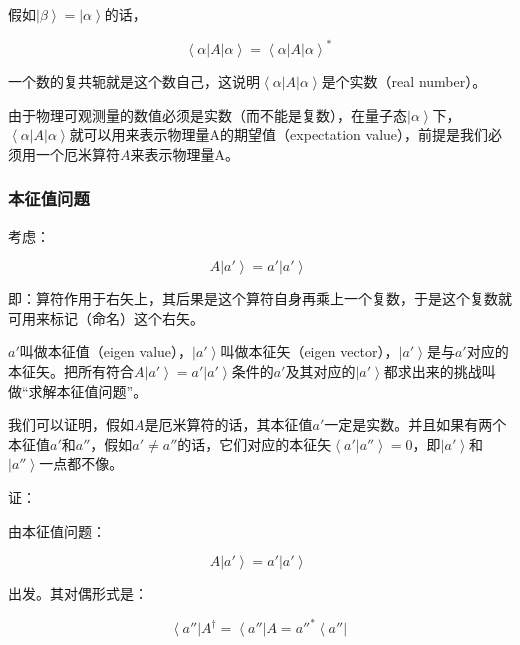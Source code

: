 \begin{enumerate}
假如$\left| \beta \right\rangle = \left| \alpha \right\rangle$的话，

\begin{equation}
\left\langle \alpha \right| A \left| \alpha \right\rangle = \left\langle \alpha \right| A \left| \alpha \right\rangle^*~
\end{equation}

一个数的复共轭就是这个数自己，这说明$\left\langle \alpha \right| A \left| \alpha \right\rangle$是个实数（real number）。

由于物理可观测量的数值必须是实数（而不能是复数），在量子态$\left| \alpha \right\rangle$下，$\left\langle \alpha \right| A \left| \alpha \right\rangle$就可以用来表示物理量A的期望值（expectation value），前提是我们必须用一个厄米算符$A$来表示物理量A。

\end{enumerate}

\subsubsection{本征值问题}

考虑：

\begin{equation}
A \left| a' \right\rangle = a' \left| a' \right\rangle~
\end{equation}

即：算符作用于右矢上，其后果是这个算符自身再乘上一个复数，于是这个复数就可用来标记（命名）这个右矢。

$a'$叫做本征值（eigen value），$\left| a' \right\rangle$叫做本征矢（eigen vector），$\left| a' \right\rangle$是与$a'$对应的本征矢。把所有符合$A \left| a' \right\rangle = a' \left| a' \right\rangle$条件的$a'$及其对应的$\left| a' \right\rangle $都求出来的挑战叫做“求解本征值问题”。

我们可以证明，假如$A$是厄米算符的话，其本征值$a'$一定是实数。并且如果有两个本征值$a'$和$a''$，假如$a' \neq a''$的话，它们对应的本征矢$\left\langle a' | a'' \right\rangle = 0$，即$\left| a' \right\rangle$和$\left| a'' \right\rangle$一点都不像。

证：

由本征值问题：

\begin{equation}
A \left| a' \right\rangle = a' \left| a' \right\rangle~
\end{equation}

出发。其对偶形式是：

\begin{equation}
\left\langle a'' \right| A^\dagger =  \left\langle a'' \right| A = a''^* \left\langle a'' \right|~
\end{equation}


